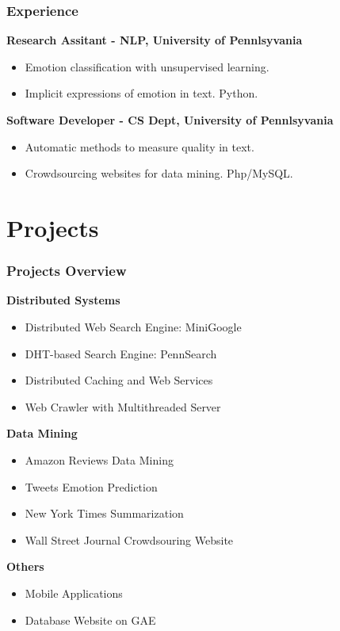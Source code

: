 \documentclass{beamer}
\begin{document}
\begin{frame}
\frametitle{Experience}
\textbf{Research Assitant - NLP, University of Pennlsyvania}
\begin{itemize}
\item Emotion classification with unsupervised learning.
\item Implicit expressions of emotion in text. Python.
\end{itemize}

\textbf{Software Developer - CS Dept, University of Pennlsyvania}
\begin{itemize}
\item Automatic methods to measure quality in text.
\item Crowdsourcing websites for data mining. Php/MySQL.
\end{itemize}

\end{frame}



\section{Projects}


\begin{frame}

\frametitle{Projects Overview}

\textbf{Distributed Systems}
\begin{itemize}
\item Distributed Web Search Engine: MiniGoogle
\item DHT-based Search Engine: PennSearch 
\item Distributed Caching and Web Services
\item Web Crawler with Multithreaded Server 
\end{itemize}


\textbf{Data Mining}
\begin{itemize}
\item Amazon Reviews Data Mining
\item Tweets Emotion Prediction
\item New York Times Summarization
\item Wall Street Journal Crowdsouring Website
\end{itemize}

\textbf{Others}
\begin{itemize}
\item Mobile Applications
\item Database Website on GAE
\end{itemize}

\end{frame}
\end{document}

